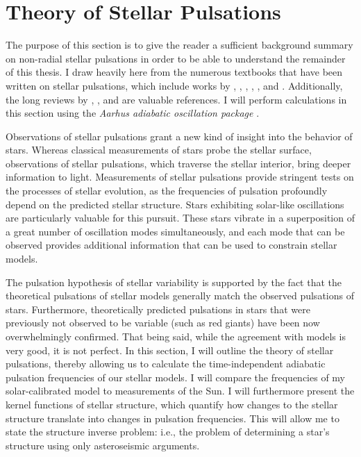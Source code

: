 \section{Theory of Stellar Pulsations} 
\label{sec:pulsation}
\begin{shaded}
\noindent The purpose of this section is to give the reader a sufficient background summary on non-radial stellar pulsations in order to be able to understand the remainder of this thesis. 
I draw heavily here from the numerous textbooks that have been written on stellar pulsations, which include works by \cite{1926ics..book.....E}, \cite{1949ptvs.book.....R}, \cite{1979nos..book.....U}, \cite{1980tsp..book.....C}, \cite{2010aste.book.....a}, and \cite{basuchaplin2017}. 
Additionally, the long reviews by \cite{1958HDP....51..353L}, \citet{1993afd..conf..399G}, and \citet{2016lrsp...13....2b} are valuable references.
I will perform calculations in this section using the \emph{Aarhus adiabatic oscillation package} \citep[\textsc{ADIPLS},][]{2008Ap&SS.316..113C}. 
\end{shaded}

Observations of stellar pulsations grant a new kind of insight into the behavior of stars. 
Whereas classical measurements of stars probe the stellar surface, observations of stellar pulsations, which traverse the stellar interior, bring deeper information to light. 
Measurements of stellar pulsations provide stringent tests on the processes of stellar evolution, as the frequencies of pulsation profoundly depend on the predicted stellar structure. 
Stars exhibiting solar-like oscillations are particularly valuable for this pursuit. 
These stars vibrate in a superposition of a great number of oscillation modes simultaneously, and each mode that can be observed provides additional information that can be used to constrain stellar models. 

The pulsation hypothesis of stellar variability is supported by the fact that the theoretical pulsations of stellar models generally match the observed pulsations of stars. 
Furthermore, theoretically predicted pulsations in stars that were previously not observed to be variable (such as red giants) have been now overwhelmingly confirmed. 
That being said, while the agreement with models is very good, it is not perfect. 
In this section, I will outline the theory of stellar pulsations, thereby allowing us to calculate the time-independent adiabatic pulsation frequencies of our stellar models. 
I will compare the frequencies of my solar-calibrated model to measurements of the Sun. 
I will furthermore present the kernel functions of stellar structure, which quantify how changes to the stellar structure translate into changes in pulsation frequencies. 
This will allow me to state the structure inverse problem: i.e., the problem of determining a star's structure using only asteroseismic arguments. 



